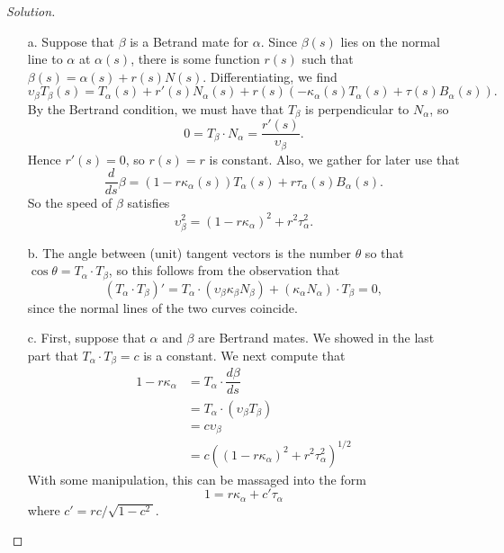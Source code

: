 \documentclass[Shifrin_Solutions_Spring_2018]{subfiles}
\begin{document}
\begin{proof}[Solution]$ \ $ \\
\begin{itemize}
\item[a.] Suppose that $\beta$ is a Betrand mate for $\alpha$. Since $\beta(s)$ lies on 
the normal line to $\alpha$ at $\alpha(s)$, there is some function $r(s)$ such that 
$\beta(s) = \alpha(s) + r(s) N(s)$. Differentiating, we find
\[
\upsilon_{\beta} T_{\beta}(s)  = T_{\alpha}(s) + r'(s) N_{\alpha}(s) 
+ r(s) \left( -\kappa_{\alpha}(s) T_{\alpha}(s) + \tau(s) B_{\alpha}(s) \right)  .
\]
By the Bertrand condition, we must have that $T_{\beta}$ is perpendicular to 
$N_{\alpha}$, so
\[
0 = T_{\beta} \cdot N_{\alpha} = \dfrac{r'(s)}{\upsilon_{\beta}}.
\]
Hence $r'(s) = 0$, so $r(s)=r$ is constant. Also, we gather for later use that
\[
\dfrac{d}{ds}\beta = (1- r \kappa_{\alpha}(s) )T_{\alpha}(s) 
+ r\tau_{\alpha}(s) B_{\alpha}(s).
\]
So the speed of $\beta$ satisfies
\[
\upsilon_{\beta}^2 = (1-r\kappa_{\alpha})^2 + r^2 \tau_{\alpha}^2.
\]


\item[b.] The angle between (unit) tangent vectors is the number $\theta$ so that 
$\cos\theta = T_{\alpha}\cdot T_{\beta}$, so this follows from the observation that
\[
\left( T_{\alpha} \cdot T_{\beta} \right)' = T_{\alpha} \cdot(\upsilon_{\beta}\kappa_{\beta}N_{\beta}) 
+ (\kappa_{\alpha} N_{\alpha}) \cdot T_{\beta} = 0 ,
\]
since the normal lines of the two curves coincide.

\item[c.] First, suppose that $\alpha$ and $\beta$ are Bertrand mates.  We showed 
in the last part that $T_{\alpha} \cdot T_{\beta} = c$ is a constant. We next 
compute that
\[
\begin{split}
1- r \kappa_{\alpha} & = T_{\alpha} \cdot \dfrac{d\beta}{ds} \\
	& = T_{\alpha} \cdot (\upsilon_{\beta} T_{\beta} ) \\
	& = c \upsilon_{\beta} \\
	& = c \left( (1-r\kappa_{\alpha})^2 + r^2 \tau_{\alpha}^2 \right)^{1/2}
\end{split}
\]
With some manipulation, this can be massaged into the form
\[
1 = r \kappa_{\alpha} + c' \tau_{\alpha}
\]
where $c' = r c / \sqrt{1-c^2\,}$. \\


\end{itemize}
\end{proof}
\end{document}
